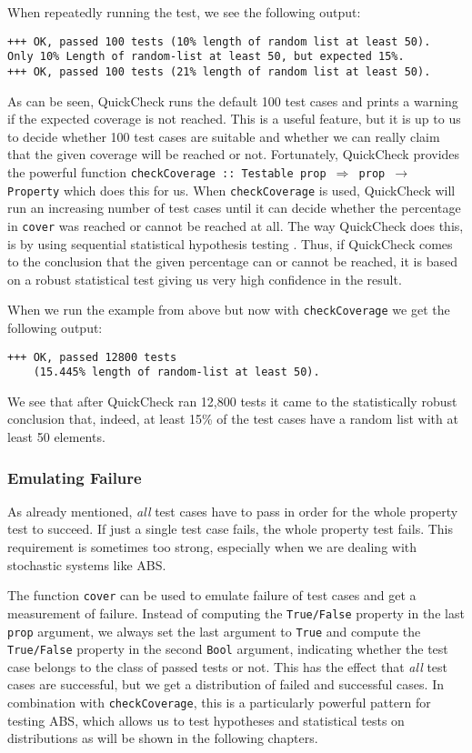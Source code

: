 When repeatedly running the test, we see the following output:

\begin{verbatim}
+++ OK, passed 100 tests (10% length of random list at least 50).
Only 10% Length of random-list at least 50, but expected 15%.
+++ OK, passed 100 tests (21% length of random list at least 50).
\end{verbatim}

As can be seen, QuickCheck runs the default 100 test cases and prints a warning if the expected coverage is not reached. This is a useful feature, but it is up to us to decide whether 100 test cases are suitable and whether we can really claim that the given coverage will be reached or not. Fortunately, QuickCheck provides the powerful function \texttt{checkCoverage :: Testable prop $\Rightarrow$ prop $\rightarrow$ Property} which does this for us. When \texttt{checkCoverage} is used, QuickCheck will run an increasing number of test cases until it can decide whether the percentage in \texttt{cover} was reached or cannot be reached at all. The way QuickCheck does this, is by using sequential statistical hypothesis testing \cite{wald_sequential_1992}. Thus, if QuickCheck comes to the conclusion that the given percentage can or cannot be reached, it is based on a robust statistical test giving us very high confidence in the result.

When we run the example from above but now with \texttt{checkCoverage} we get the following output:

\begin{verbatim}
+++ OK, passed 12800 tests 
    (15.445% length of random-list at least 50).
\end{verbatim}

We see that after QuickCheck ran 12,800 tests it came to the statistically robust conclusion that, indeed, at least 15\% of the test cases have a random list with at least 50 elements. 

\subsubsection{Emulating Failure}
As already mentioned, \textit{all} test cases have to pass in order for the whole property test to succeed. If just a single test case fails, the whole property test fails. This requirement is sometimes too strong, especially when we are dealing with stochastic systems like ABS.

The function \texttt{cover} can be used to emulate failure of test cases and get a measurement of failure. Instead of computing the \texttt{True/False} property in the last \texttt{prop} argument, we always set the last argument to \texttt{True} and compute the \texttt{True/False} property in the second \texttt{Bool} argument, indicating whether the test case belongs to the class of passed tests or not. This has the effect that \textit{all} test cases are successful, but we get a distribution of failed and successful cases. In combination with \texttt{checkCoverage}, this is a particularly powerful pattern for testing ABS, which allows us to test hypotheses and statistical tests on distributions as will be shown in the following chapters.